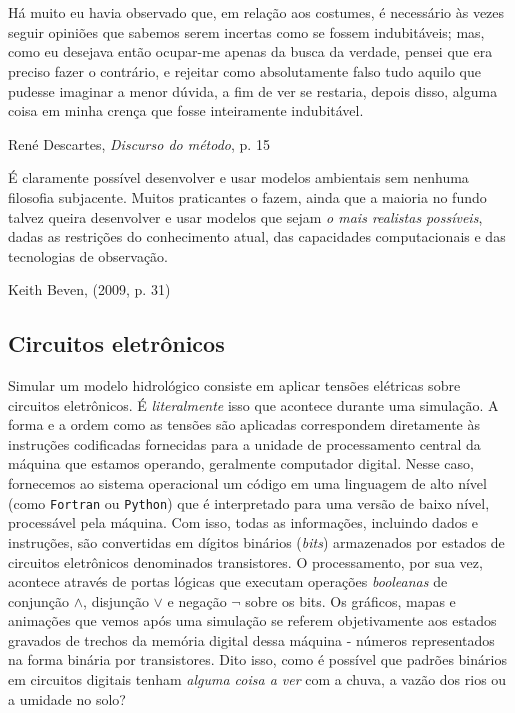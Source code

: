 \documentclass[./main.tex]{subfiles}
\begin{document}
\chapter{\chapEpis} \label{chap:episteme}

\setlength{\parskip}{0mm}

\epigraph{\small{Há muito eu havia observado que, em relação aos costumes, é necessário às vezes seguir opiniões que sabemos serem incertas como se fossem indubitáveis; mas, como eu desejava então ocupar-me apenas da busca da verdade, pensei que era preciso fazer o contrário, e rejeitar como absolutamente falso tudo aquilo que pudesse imaginar a menor dúvida, a fim de ver se restaria, depois disso, alguma coisa em minha crença que fosse inteiramente indubitável.}}{René Descartes, \textit{Discurso do método}, p. 15 \cite{descartes2008discurso}}

\epigraph{\small{É claramente possível desenvolver e usar modelos ambientais sem nenhuma filosofia subjacente. Muitos praticantes o fazem, ainda que a maioria no fundo talvez queira desenvolver e usar modelos que sejam \textit{o mais realistas possíveis}, dadas as restrições do conhecimento atual, das capacidades computacionais e das tecnologias de observação.}}{Keith Beven, (2009, p. 31) \cite{Beven2009}}

\setlength{\parskip}{\myparskip}

\section{Circuitos eletrônicos}\label{sec:epis:intro}

\par Simular um modelo hidrológico consiste em aplicar tensões elétricas sobre circuitos eletrônicos. É \textit{literalmente} isso que acontece durante uma simulação. A forma e a ordem como as tensões são aplicadas correspondem diretamente às instruções codificadas fornecidas para a unidade de processamento central da máquina que estamos operando, geralmente computador digital. Nesse caso, fornecemos ao sistema operacional um código em uma linguagem de alto nível (como \texttt{Fortran} ou \texttt{Python}) que é interpretado para uma versão de baixo nível, processável pela máquina. Com isso, todas as informações, incluindo dados e instruções, são convertidas em dígitos binários (\textit{bits}) armazenados por estados de circuitos eletrônicos denominados transistores. O processamento, por sua vez, acontece através de portas lógicas que executam operações \textit{booleanas} de conjunção $\land$, disjunção $\lor$ e negação $\neg$ sobre os bits. Os gráficos, mapas e animações que vemos após uma simulação se referem objetivamente aos estados gravados de trechos da memória digital dessa máquina - números representados na forma binária por transistores. Dito isso, como é possível que padrões binários em circuitos digitais tenham \textit{alguma coisa a ver} com a chuva, a vazão dos rios ou a umidade no solo?
\end{document}
